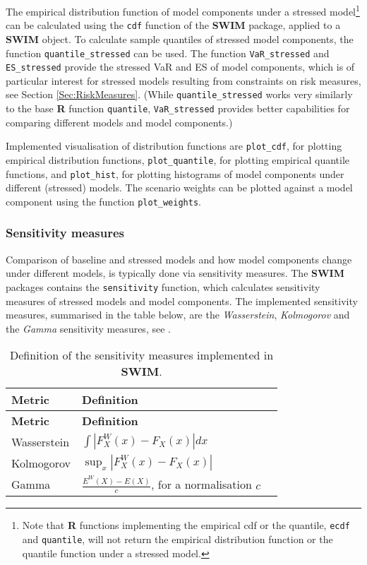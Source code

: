 \documentclass[
]{article}
\begin{document}
The empirical distribution function of model components under a stressed model\footnote{Note that \textbf{R} functions implementing the empirical cdf or the quantile, \texttt{ecdf} and \texttt{quantile}, will not return the empirical distribution function or the quantile function under a stressed model.} can be calculated using the \texttt{cdf} function of the \textbf{SWIM} package, applied to a \textbf{SWIM} object. To calculate sample quantiles of stressed model components, the function \texttt{quantile\_stressed} can be used. The function \texttt{VaR\_stressed} and \texttt{ES\_stressed} provide the stressed VaR and ES of model components, which is of particular interest for stressed models resulting from constraints on risk measures, see Section \ref{Sec:RiskMeasures}. (While \texttt{quantile\_stressed} works very similarly to the base \textbf{R} function \texttt{quantile}, \texttt{VaR\_stressed} provides better capabilities for comparing different models and model components.)

Implemented visualisation of distribution functions are \texttt{plot\_cdf}, for plotting empirical distribution functions, \texttt{plot\_quantile}, for plotting empirical quantile functions, and \texttt{plot\_hist}, for plotting histograms of model components under different (stressed) models. The scenario weights can be plotted against a model component using the function \texttt{plot\_weights}.

\hypertarget{sensitivity-measures}{%
\subsubsection{Sensitivity measures}\label{sensitivity-measures}}

Comparison of baseline and stressed models and how model components change under different models, is typically done via sensitivity measures. The \textbf{SWIM} packages contains the \texttt{sensitivity} function, which calculates sensitivity measures of stressed models and model components. The implemented sensitivity measures, summarised in the table below, are the \emph{Wasserstein}, \emph{Kolmogorov} and the \emph{Gamma} sensitivity measures, see \citet{Pesenti2016DM} \citet{Pesenti2019} \citet{Emmer2015JR}.

\begin{longtable}[]{@{}lll@{}}
\caption{\label{tab:sensitivity} Definition of the sensitivity measures implemented in \textbf{SWIM}.}\tabularnewline
\toprule
\textbf{Metric} & \textbf{Definition} &\tabularnewline
\midrule
\endfirsthead
\toprule
\textbf{Metric} & \textbf{Definition} &\tabularnewline
\midrule
\endhead
Wasserstein & \(\int | F^W_X (x) - F_X(x)| dx\) &\tabularnewline
Kolmogorov & \(\sup_x |F^W_X (x) - F_X(x)|\) &\tabularnewline
Gamma & \(\frac{E^W(X) - E(X)}{c}\), for a normalisation \(c\) &\tabularnewline
\bottomrule
\end{longtable}
\end{document}
